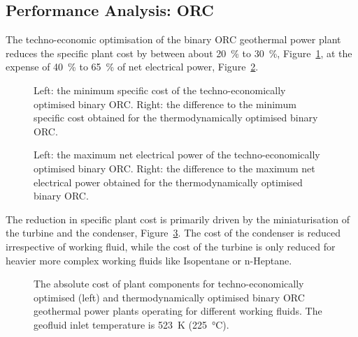 \subsection{Performance Analysis: ORC}
    The techno-economic optimisation of the binary \ac{ORC} geothermal power plant reduces the specific plant cost by between about \qty{20}{\percent} to \qty{30}{\percent}, Figure~\ref{fig:prosim_purewater_Wnet_ORC_thermo_vs_techno}, at the expense of \qty{40}{\percent} to \qty{65}{\percent} of net electrical power, Figure~\ref{fig:prosim_purewater_SpecCost_ORC_thermo_vs_techno}. 
    \begin{figure}[H]
        \centering
        \resizebox{\linewidth}{!}{}
        \caption[The minimum specific cost of the techno-economically optimised  binary \ac{ORC}.]{Left: the minimum specific cost of the techno-economically optimised  binary \ac{ORC}. Right: the difference to the minimum specific cost obtained for the thermodynamically optimised binary \ac{ORC}.}
        \label{fig:prosim_purewater_Wnet_ORC_thermo_vs_techno}
    \end{figure}

    \begin{figure}[H]
        \centering
        \resizebox{\linewidth}{!}{}
        \caption[The maximum net electrical power of the techno-economically optimised  binary \ac{ORC}.]{Left: the maximum net electrical power of the techno-economically optimised  binary \ac{ORC}. Right: the difference to the maximum net electrical power obtained for the thermodynamically optimised binary \ac{ORC}.}
        \label{fig:prosim_purewater_SpecCost_ORC_thermo_vs_techno}
    \end{figure}

    The reduction in specific plant cost is primarily driven by the miniaturisation of the turbine and the condenser, Figure~\ref{fig:prosim_purewater_ORC_techno_Costbreakdown}. The cost of the condenser is reduced irrespective of working fluid, while the cost of the turbine is only reduced for heavier more complex working fluids like Isopentane or n-Heptane.

    \begin{figure}[H]
        \centering
        
        \caption[The absolute cost of plant components for techno-economically optimised and thermodynamically optimised binary \ac{ORC} geothermal power plants by working fluid.]{The absolute cost of plant components for techno-economically optimised (left) and thermodynamically optimised binary \ac{ORC} geothermal power plants operating for different working fluids. The geofluid inlet temperature is \qty{523}{\K} (\qty{225}{\degreeCelsius}).}
        \label{fig:prosim_purewater_ORC_techno_Costbreakdown}
    \end{figure}

